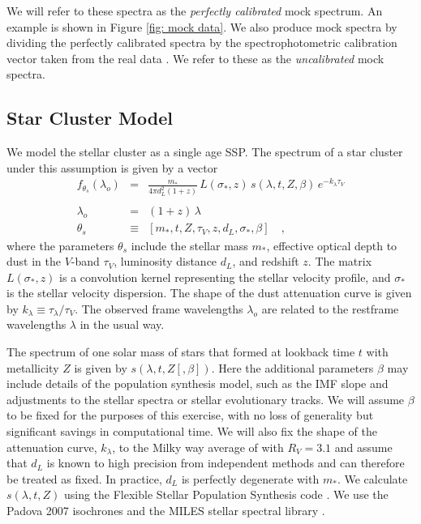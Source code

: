 \documentclass[iop,numberedappendix]{emulateapj}
\begin{document}
We will refer to these spectra as the \emph{perfectly calibrated} mock
spectrum.  An example is shown in Figure \ref{fig: mock data}. We also
produce mock spectra by dividing the perfectly calibrated spectra by
the spectrophotometric calibration vector taken from the real data
\citep[][Fig\ref{fig:ggc_spectrum}]{schiavon05}.  We refer to these as
the \emph{uncalibrated} mock spectra.

\subsection{Star Cluster Model}
\label{sec:cluster_model}
We model the stellar cluster as a single age SSP. The spectrum of a
star cluster under this assumption is given by a vector
\begin{eqnarray} \label{eq:StarModel}\displaystyle
f_{\theta_s}(\lambda_o) & = &
\frac{m_*}{4\pi d_L^2(1+z)} \, L(\sigma_*, z) \, s(\lambda, t, Z , \beta) \, e^ {-k_\lambda\tau_V} \\
\nonumber \\ 
\lambda_o & = & (1+z)\,\lambda 
\\
\theta_s & \equiv & \left[ m_*, t, Z, \tau_V, z, d_L, \sigma_*, \beta \right]
\quad ,
\end{eqnarray} where the
parameters $\theta_s$ include 
the stellar mass $m_*$, 
effective optical depth to dust in the $V$-band $\tau_V$, 
luminosity distance $d_L$,
and redshift $z$.
The matrix $L(\sigma_*, z)$ is a convolution kernel representing the
stellar velocity profile,
and $\sigma_*$ is the stellar velocity dispersion. 
The shape of the dust attenuation curve is given by $k_\lambda \equiv
\tau_\lambda/\tau_V$.  
The observed frame wavelengths $\lambda_o$ are related to the
restframe wavelengths $\lambda$ in the usual way.

The spectrum of one solar mass of stars that formed at lookback time
$t$ with metallicity $Z$ is given by $s(\lambda, t, Z [, \beta])$.
Here the additional parameters $\beta$ may include details of the
population synthesis model, such as the IMF slope and adjustments to
the stellar spectra or stellar evolutionary tracks. We will assume
$\beta$ to be fixed for the purposes of this exercise, with no loss of
generality but significant savings in computational time.  We will
also fix the shape of the attenuation curve, $k_\lambda $, to the
Milky way average of \citet{CCM89} with $R_V=3.1$ and assume that
$d_L$ is known to high precision from independent methods and can
therefore be treated as fixed.  In practice, $d_L$ is perfectly
degenerate with $m_*$. We calculate $s(\lambda, t, Z)$ using the
Flexible Stellar Population Synthesis code \citep[FSPS][]{fsps}.  We
use the Padova 2007 isochrones \citep{girardi00, bertilli94, marigo07}
and the MILES stellar spectral library \citep{miles_I, miles_II,
miles_III}.
\end{document}
